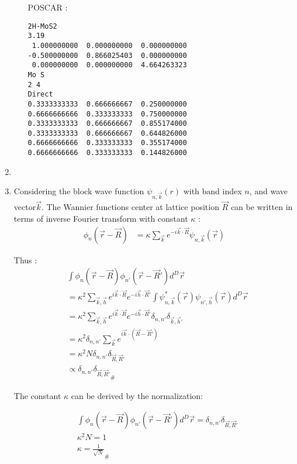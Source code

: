\documentclass[notitlepage]{revtex4-1}
\begin{document}
\begin{CJK}{UTF8}{bsmi}
\begin{enumerate}
\begin{enumerate}[label=(\alph*)]
			POSCAR :
\begin{lstlisting}
2H-MoS2
3.19
 1.000000000  0.000000000  0.000000000
-0.500000000  0.866025403  0.000000000
 0.000000000  0.000000000  4.664263323
Mo S
2 4
Direct
0.3333333333  0.666666667  0.250000000
0.6666666666  0.333333333  0.750000000
0.3333333333  0.666666667  0.855174000
0.3333333333  0.666666667  0.644826000
0.6666666666  0.333333333  0.355174000
0.6666666666  0.333333333  0.144826000
\end{lstlisting}			
		\end{enumerate}
	
	\item
	
	\item Considering the block wave function $\psi_{n,\vec{k}}(r)$ with band index $n$, and wave vector$\vec{k}$. The Wannier functions center at lattice position $\vec{R}$ can be written in terms of inverse Fourier transform with constant $\kappa$ :
	\begin{equation}
		\begin{split}
			\phi_n(\vec{r} - \vec{R}) &= \kappa \sum_{\vec{k}} e^{-i \vec{k} \cdot \vec{R}} \psi_{n,\vec{k}}(\vec{r}) 
		\end{split}
	\end{equation}   
	
	Thus :
	\begin{equation}
		\begin{split}
			& \int \phi_n(\vec{r} - \vec{R})\phi_{n'}(\vec{r} - \vec{R}')  d^{D}\vec{r} \\
			&= \kappa^2 \sum_{\vec{k},\vec{h}} e^{i \vec{k} \cdot \vec{R}} e^{-i \vec{h} \cdot \vec{R}'} \int \psi^{*}_{n,\vec{k}}(\vec{r})\psi_{n',\vec{h}}(\vec{r}) d^{D}\vec{r} \\
			&= \kappa^2 \sum_{\vec{k},\vec{h}} e^{i \vec{k} \cdot \vec{R}} e^{-i \vec{h} \cdot \vec{R}'} \delta_{n,n'} \delta_{\vec{k},\vec{h}'} \\
			&= \kappa^2 \delta_{n,n'} \sum_{\vec{k}} e^{i \vec{k} \cdot (\vec{R}-\vec{R}')} \\
			&= \kappa^2 N \delta_{n,n'} \delta_{\vec{R},\vec{R}'} \\
			&\propto \delta_{n,n'} {\delta_{\vec{R},\vec{R}'}}_{\#}
		\end{split}
	\end{equation} 	
	
	The constant $\kappa$ can be derived by the normalization:
	
	\begin{align*}
	 &\int \phi_n(\vec{r} - \vec{R})\phi_{n'}(\vec{r} - \vec{R}') d^{D}\vec{r} = \delta_{n,n'} \delta_{\vec{R},\vec{R}'} \\
	 &\kappa^2 N = 1 \\
	 &\kappa = \frac{1}{\sqrt{N}}_{\#}
	\end{align*}

			
	
	
\end{enumerate}






	
\end{CJK}
\end{document}

